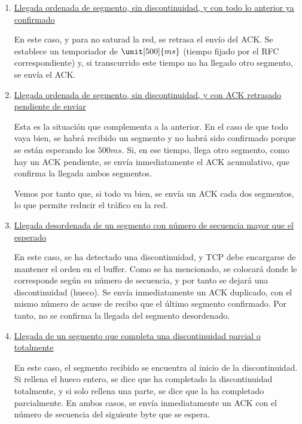 \begin{enumerate}
    \item \ul{Llegada ordenada de segmento, sin discontinuidad, y con todo lo anterior ya} \\ \ul{confirmado}
    
    En este caso, y para no saturad la red, se retrasa el envío del \acrshort{ACK}. Se establece un temporiador de $\unit[500]{ms}$ (tiempo fijado por el \acrshort{RFC} correspondiente) y, si transcurrido este tiempo no ha llegado otro segmento, se envía el \acrshort{ACK}.

    \item \ul{Llegada ordenada de segmento, sin discontinuidad, y con \acrshort{ACK} retrasado} \\ \ul{pendiente de enviar}
    
    Esta es la situación que complementa a la anterior. En el caso de que todo vaya bien, se habrá recibido un segmento y no habrá sido confirmado porque se están esperando los $\unit{500}{ms}$. Si, en ese tiempo, llega otro segmento, como hay un \acrshort{ACK} pendiente, se envía inmediatamente el \acrshort{ACK} acumulativo, que confirma la llegada ambos segmentos.

    Vemos por tanto que, si todo va bien, se envía un \acrshort{ACK} cada dos segmentos, lo que permite reducir el tráfico en la red.
    \item \ul{Llegada desordenada de un segmento
    con número de secuencia mayor que el}\\\ul{esperado}

    En este caso, se ha detectado una discontinuidad, y \acrshort{TCP} debe encargarse de mantener el orden en el buffer. Como se ha mencionado, se colocará donde le corresponde según su número de secuencia, y por tanto se dejará una discontinuidad (hueco). Se envía inmediatamente un \acrshort{ACK} duplicado, con el mismo número de acuse de recibo que el último segmento confirmado. Por tanto, no se confirma la llegada del segmento desordenado.

    \item \ul{Llegada de un segmento que completa
    una discontinuidad parcial o totalmente}

    En este caso, el segmento recibido se encuentra al inicio de la discontinuidad. Si rellena el hueco entero, se dice que ha completado la discontinuidad totalmente, y si solo rellena una parte, se dice que la ha completado parcialmente. En ambos casos, se envía inmediatamente un \acrshort{ACK} con el número de secuencia del siguiente byte que se espera.
\end{enumerate}


